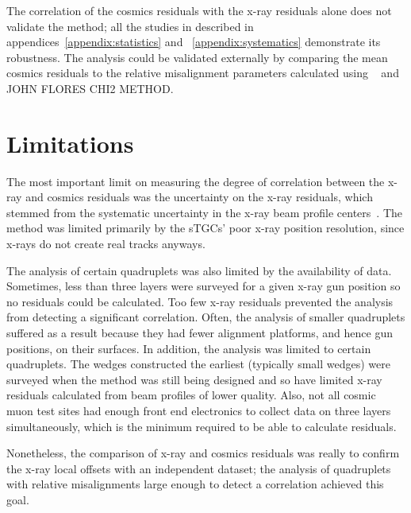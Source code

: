 The correlation of the cosmics residuals with the x-ray residuals alone does not validate the method; all the studies in described in appendices~\ref{appendix:statistics} and ~\ref{appendix:systematics} demonstrate its robustness. The analysis could be validated externally by comparing the mean cosmics residuals to the relative misalignment parameters calculated using ~\cite{lefebvre_tgc_analysis} and JOHN FLORES CHI2 METHOD.

\section{Limitations}
The most important limit on measuring the degree of correlation between the x-ray and cosmics residuals was the uncertainty on the x-ray residuals, which stemmed from the systematic uncertainty in the x-ray beam profile centers~\cite{lefebvre_precision_2020}. The method was limited primarily by the sTGCs' poor x-ray position resolution, since x-rays do not create real tracks anyways. 

The analysis of certain quadruplets was also limited by the availability of data. Sometimes, less than three layers were surveyed for a given x-ray gun position so no residuals could be calculated. Too few x-ray residuals prevented the analysis from detecting a significant correlation. Often, the analysis of smaller quadruplets suffered as a result because they had fewer alignment platforms, and hence gun positions, on their surfaces. In addition, the analysis was limited to certain quadruplets. The wedges constructed the earliest (typically small wedges) were surveyed when the method was still being designed and so have limited x-ray residuals calculated from beam profiles of lower quality. Also, not all cosmic muon test sites had enough front end electronics to collect data on three layers simultaneously, which is the minimum required to be able to calculate residuals.

Nonetheless, the comparison of x-ray and cosmics residuals was really to confirm the x-ray local offsets with an independent dataset; the analysis of quadruplets with relative misalignments large enough to detect a correlation achieved this goal.
